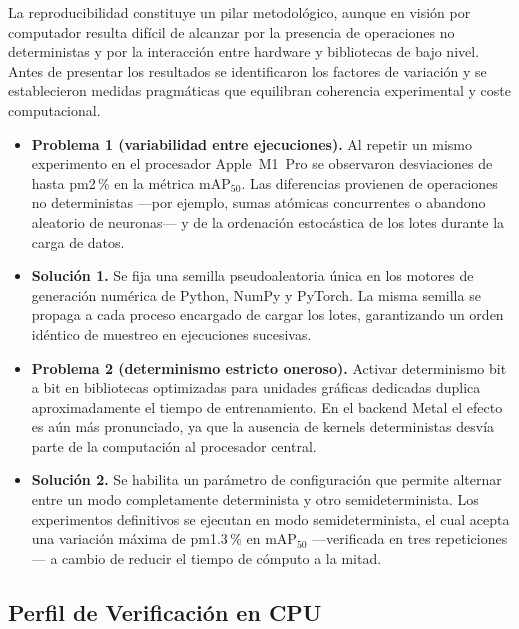 La reproducibilidad constituye un pilar metodológico, aunque en visión por computador resulta difícil de alcanzar por la presencia de operaciones no deterministas y por la interacción entre hardware y bibliotecas de bajo nivel.
Antes de presentar los resultados se identificaron los factores de variación y se establecieron medidas pragmáticas que equilibran coherencia experimental y coste computacional.

\begin{itemize}

  \item \textbf{Problema 1 (variabilidad entre ejecuciones).}
        Al repetir un mismo experimento en el procesador Apple~M1~Pro se observaron desviaciones de hasta pm2\,\% en la métrica \(\text{mAP}_{50}\).
        Las diferencias provienen de operaciones no deterministas —por ejemplo, sumas atómicas concurrentes o abandono aleatorio de neuronas— y de la ordenación estocástica de los lotes durante la carga de datos.

  \item \textbf{Solución 1.}
        Se fija una semilla pseudoaleatoria única en los motores de generación numérica de Python, NumPy y PyTorch.
        La misma semilla se propaga a cada proceso encargado de cargar los lotes, garantizando un orden idéntico de muestreo en ejecuciones sucesivas.

  \item \textbf{Problema 2 (determinismo estricto oneroso).}
        Activar determinismo bit a bit en bibliotecas optimizadas para unidades gráficas dedicadas duplica aproximadamente el tiempo de entrenamiento.
        En el backend Metal el efecto es aún más pronunciado, ya que la ausencia de kernels deterministas desvía parte de la computación al procesador central.

  \item \textbf{Solución 2.}
        Se habilita un parámetro de configuración que permite alternar entre un modo completamente determinista y otro semideterminista.
        Los experimentos definitivos se ejecutan en modo semideterminista, el cual acepta una variación máxima de pm1.3\,\% en \(\text{mAP}_{50}\) —verificada en tres repeticiones— a cambio de reducir el tiempo de cómputo a la mitad.

\end{itemize}

\subsection{Perfil de Verificación en CPU}\label{ssec:cpu_pilot}


